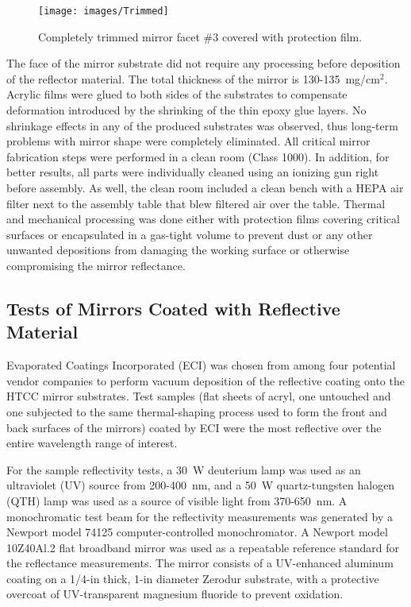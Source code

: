 \begin{figure}[ht]
    \centering
    \texttt{[image: images/Trimmed]}
    \caption{Completely trimmed mirror facet \#3 covered with protection film. }
    \label{fig:Trimmed}
\end{figure}

The face of the mirror substrate did not require any processing before deposition of the reflector material. The
total thickness of the mirror is 130-135~mg/cm$^2$. Acrylic films were glued to both sides of the substrates to
compensate deformation introduced by the shrinking of the thin epoxy glue layers. No shrinkage effects in any of
the produced substrates was observed, thus long-term problems with mirror shape were completely eliminated.
All critical mirror fabrication steps were performed in a clean room (Class 1000). In addition, for better results,
all parts were individually cleaned using an ionizing gun right before assembly. As well, the clean room included a
clean bench with a HEPA air filter next to the assembly table that blew filtered air over the table. Thermal and
mechanical processing was done either with protection films covering critical surfaces or encapsulated in a
gas-tight volume to prevent dust or any other unwanted depositions from damaging the working surface or
otherwise compromising the mirror reflectance.

\subsection{Tests of Mirrors Coated with Reflective Material}

Evaporated Coatings Incorporated (ECI) was chosen from among four potential vendor companies to perform
vacuum deposition of the reflective coating onto the HTCC mirror substrates. Test samples (flat sheets of acryl,
one untouched and one subjected to the same thermal-shaping process used to form the front and back surfaces
of the mirrors) coated by ECI were the most reflective over the entire wavelength range of interest.

For the sample reflectivity tests, a 30~W deuterium lamp was used as an ultraviolet (UV) source from
200-400~nm, and a 50~W quartz-tungsten halogen (QTH) lamp was used as a source of visible light from
370-650~nm. A monochromatic test beam for the reflectivity measurements was generated by a Newport
model 74125 computer-controlled monochromator. A Newport model 10Z40Al.2 flat broadband mirror was
used as a repeatable reference standard for the reflectance measurements. The mirror consists of a
UV-enhanced aluminum coating on a 1/4-in thick, 1-in diameter Zerodur substrate, with a protective overcoat
of UV-transparent magnesium fluoride to prevent oxidation.

